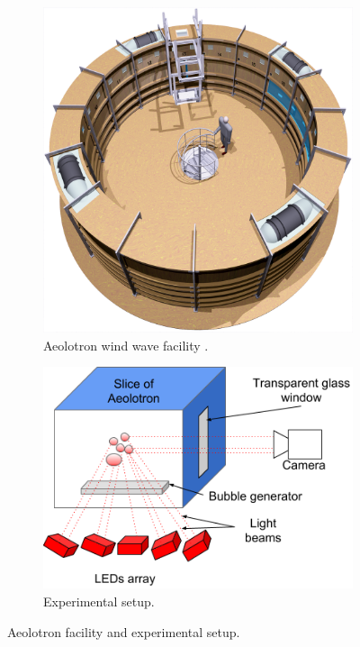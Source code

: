 		\begin{figure}
			\centering
			\begin{subfigure}[t]{.4\linewidth}
				\centering
				\includegraphics[scale=0.15]{images/aeolotron-gesamt.png}
				\caption{Aeolotron wind wave facility \citep{Krall2013}.}
			\end{subfigure}
			\begin{subfigure}[t]{.4\linewidth}		
				\centering
				\includegraphics[scale=.5]{images/aeolotron_setup.png}
				\caption{Experimental setup.}
			\end{subfigure}
			
			\caption{Aeolotron facility and experimental setup.}
			\label{fig:aeolotron_setup}
		\end{figure}
	
